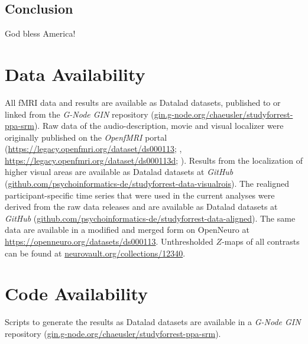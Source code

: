 \subsection{Conclusion}

God bless America!


\section{Data Availability}



All fMRI data and results are available as Datalad \citep{halchenko2021datalad}
datasets, published to or linked from the \emph{G-Node GIN} repository
(\href{https://gin.g-node.org/chaeusler/studyforrest-ppa-srm}{\url{gin.g-node.org/chaeusler/studyforrest-ppa-srm}}).
Raw data of the audio-description, movie and visual localizer were originally
published on the \emph{OpenfMRI} portal
(\url{https://legacy.openfmri.org/dataset/ds000113}; \citep{Hanke2014ds000113},
\space \url{https://legacy.openfmri.org/dataset/ds000113d};
\citep{hanke2016ds000113d}).
Results from the localization of higher visual areas are available as Datalad
datasets at \emph{GitHub}
(\href{https://github.com/psychoinformatics-de/studyforrest-data-visualrois}{\url{github.com/psychoinformatics-de/studyforrest-data-visualrois}}).
The realigned participant-specific time series that were used in the current
analyses were derived from the raw data releases and are available as Datalad
datasets at \emph{GitHub}
(\href{https://github.com/psychoinformatics-de/studyforrest-data-aligned}{\url{github.com/psychoinformatics-de/studyforrest-data-aligned}}).
The same data are available in a modified and merged form on OpenNeuro at
\url{https://openneuro.org/datasets/ds000113}.
Unthresholded $Z$-maps of all contrasts can be found at
\href{https://identifiers.org/neurovault.collection:12340}{\url{neurovault.org/collections/12340}}.


\section*{Code Availability}

Scripts to generate the results as Datalad \citep{halchenko2021datalad} datasets
are available in a \emph{G-Node GIN} repository
(\href{https://gin.g-node.org/chaeusler/studyforrest-ppa-srm}{\url{gin.g-node.org/chaeusler/studyforrest-ppa-srm}}).



